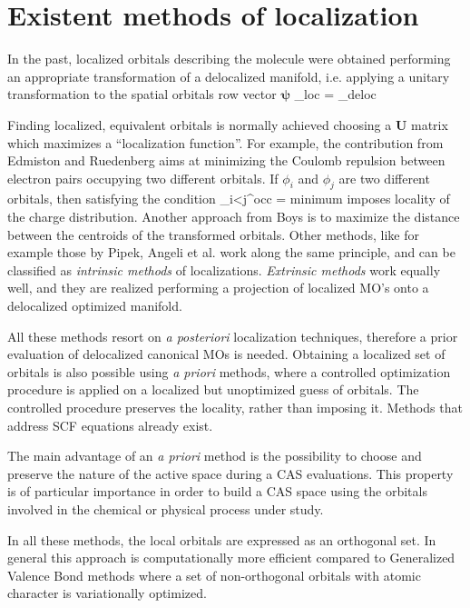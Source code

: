\section{Existent methods of localization}

In the past, localized orbitals describing the molecule were obtained
performing an appropriate transformation of a delocalized manifold, i.e.
applying a unitary transformation to the spatial orbitals row vector
$\mathbf{\psi}$
\beq
\mathbf{\psi}_{\mbox{\tiny loc}} = \mathbf{\psi}_{\mbox{\tiny deloc}} 
\eeq

Finding localized, equivalent orbitals is normally achieved choosing a
$\mathbf{U}$ matrix which maximizes a ``localization function''.
For example, the contribution from Edmiston and Ruedenberg
\cite{rmp-34-457-1963} aims at minimizing the Coulomb repulsion between
electron pairs occupying two different orbitals.  If $\phi_i$ and $\phi_j$
are two different orbitals, then satisfying the condition
\beq
\sum_{i<j}^{\mbox{\tiny occ}}  = \mbox{minimum}
\eeq
imposes locality of the charge distribution.  Another approach from
Boys\cite{rmp-32-2-1960} is to maximize the distance between the centroids
of the transformed orbitals.  Other methods, like for example those by
Pipek\cite{jcp-90-4916-1989}, Angeli et al.\cite{cpl-233-102-1995} work
along the same principle, and can be classified as \textit{intrinsic
methods} of localizations.  \textit{Extrinsic methods} work equally well,
and they are realized performing a projection of localized MO's onto a
delocalized optimized manifold\cite{chavet-ladiqc}. 

All these methods resort on \textit{a posteriori} localization techniques,
therefore a prior evaluation of delocalized canonical MOs is needed.
Obtaining a localized set of orbitals is also possible using \textit{a
priori} methods, where a controlled optimization procedure is applied on a
localized but unoptimized guess of orbitals.  The controlled procedure
preserves the locality, rather than imposing it. Methods that address SCF
equations already exist\cite{jcp-34-89-1961,prl-4-17-1969,gilbert-moicpb}.

The main advantage of an \textit{a priori} method is the possibility to
choose and preserve the nature of the active space during a CAS evaluations.
This property is of particular importance in order to build a CAS space
using the orbitals involved in the chemical or physical process under study.

In all these methods, the local orbitals are expressed as an orthogonal set.
In general this approach is computationally more efficient compared to
Generalized Valence Bond methods\cite{jcp-57-738-1972,bobrowicz-mest}
where a set of non-orthogonal orbitals with atomic character is
variationally optimized.

